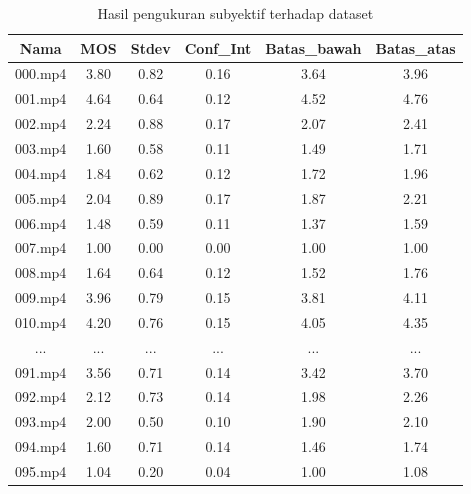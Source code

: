 \begin{table}[H]
	\fontsize{9pt}{9pt}\selectfont
	\centering
	\caption{Hasil pengukuran subyektif terhadap dataset}
	\label{obyektif-skor}
		\begin{tabular}{|c|c|c|c|c|c|}
			\hline
			\rowcolor[HTML]{EFEFEF} 
			Nama    & MOS  & Stdev & Conf\_Int & Batas\_bawah & Batas\_atas \\ \hline
			000.mp4 & 3.80 & 0.82  & 0.16      & 3.64         & 3.96        \\ \hline
			001.mp4 & 4.64 & 0.64  & 0.12      & 4.52         & 4.76        \\ \hline
			002.mp4 & 2.24 & 0.88  & 0.17      & 2.07         & 2.41        \\ \hline
			003.mp4 & 1.60 & 0.58  & 0.11      & 1.49         & 1.71        \\ \hline
			004.mp4 & 1.84 & 0.62  & 0.12      & 1.72         & 1.96        \\ \hline
			005.mp4 & 2.04 & 0.89  & 0.17      & 1.87         & 2.21        \\ \hline
			006.mp4 & 1.48 & 0.59  & 0.11      & 1.37         & 1.59        \\ \hline
			007.mp4 & 1.00 & 0.00  & 0.00      & 1.00         & 1.00        \\ \hline
			008.mp4 & 1.64 & 0.64  & 0.12      & 1.52         & 1.76        \\ \hline
			009.mp4 & 3.96 & 0.79  & 0.15      & 3.81         & 4.11        \\ \hline
			010.mp4 & 4.20 & 0.76  & 0.15      & 4.05         & 4.35        \\ \hline
			...     & ...  & ...   & ...       & ...          & ...         \\ \hline
			091.mp4 & 3.56 & 0.71  & 0.14      & 3.42         & 3.70        \\ \hline
			092.mp4 & 2.12 & 0.73  & 0.14      & 1.98         & 2.26        \\ \hline
			093.mp4 & 2.00 & 0.50  & 0.10      & 1.90         & 2.10        \\ \hline
			094.mp4 & 1.60 & 0.71  & 0.14      & 1.46         & 1.74        \\ \hline
			095.mp4 & 1.04 & 0.20  & 0.04      & 1.00         & 1.08        \\ \hline

\end{tabular}
\end{table}
